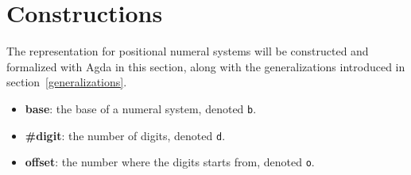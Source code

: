 \documentclass[\main/thesis.tex]{subfiles}
\begin{document}
\chapter{Constructions}\label{constructions}

The representation for positional numeral systems will be constructed and
formalized with Agda in this section,
along with the generalizations introduced in section~\ref{generalizations}.

\begin{itemize}
    \item \textbf{base}: the base of a numeral system, denoted {\lstinline|b|}.
    \item \textbf{\#digit}: the number of digits, denoted {\lstinline|d|}.
    \item \textbf{offset}: the number where the digits starts from, denoted {\lstinline|o|}.
\end{itemize}










%
%
%
\end{document}
